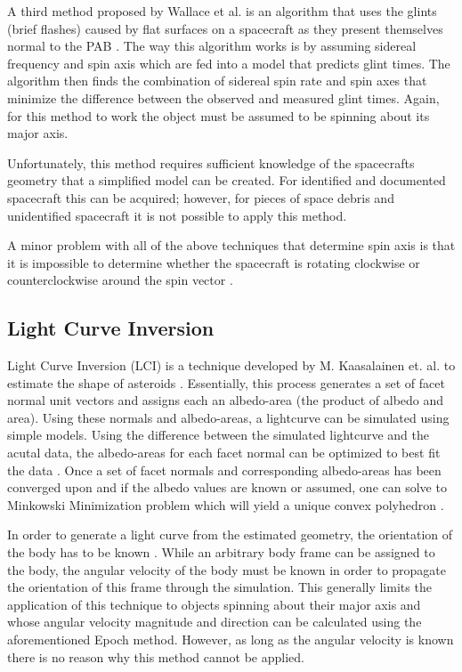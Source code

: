 \documentclass{article}
\begin{document}
A third method proposed by Wallace et al.  is an algorithm that uses the glints (brief flashes) caused by flat surfaces on a spacecraft as they present themselves normal to the PAB \cite{Wallace}. The way this algorithm works is by assuming sidereal frequency and spin axis which are fed into a model that predicts glint times. The algorithm then finds the combination of sidereal spin rate and spin axes that minimize the difference between the observed and measured glint times. Again, for this method to work the object must be assumed to be spinning about its major axis.

Unfortunately, this method requires sufficient knowledge of the spacecrafts geometry that a simplified model can be created. For identified and documented spacecraft this can be acquired; however, for pieces of space debris and unidentified spacecraft it is not possible to apply this method.

A minor problem with all of the above techniques that determine spin axis is that it is impossible to determine whether the spacecraft is rotating clockwise or counterclockwise around the spin vector \cite{Magnusson1989DeterminationOP}.

\subsection{Light Curve Inversion}

Light Curve Inversion (LCI) is a technique developed by M. Kaasalainen et. al. to estimate the shape of asteroids \cite{KAASALAINEN2002369}. Essentially, this process generates a set of facet normal unit vectors and assigns each an albedo-area (the product of albedo and area). Using these normals and albedo-areas, a lightcurve can be simulated using simple models. Using the difference between the simulated lightcurve and the acutal data, the albedo-areas for each facet normal can be optimized to best fit the data \cite{Kaasalainen}. Once a set of facet normals and corresponding albedo-areas has been converged upon and if the albedo values are known or assumed, one can solve to Minkowski Minimization problem which will yield a unique convex polyhedron \cite{Minkowski1989}.

In order to generate a light curve from the estimated geometry, the orientation of the body has to be known \cite{PSI}. While an arbitrary body frame can be assigned to the body, the angular velocity of the body must be known in order to propagate the orientation of this frame through the simulation. This generally limits the application of this technique to objects spinning about their major axis and whose angular velocity magnitude and direction can be calculated using the aforementioned Epoch method. However, as long as the angular velocity is known there is no reason why this method cannot be applied.
\end{document}

